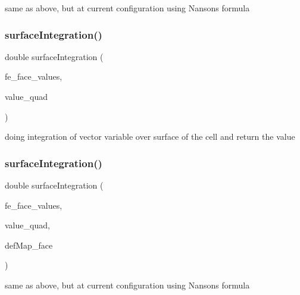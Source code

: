 same as above, but at current configuration using Nanson\textquotesingle{}s formula \mbox{\label{class_residual_a6753ecdc0e19b7bac24615d47889ae65}} 
\subsubsection{\texorpdfstring{surfaceIntegration()}{surfaceIntegration()}\hspace{0.1cm}{\footnotesize\ttfamily [3/6]}}
{\footnotesize\ttfamily double surface\+Integration (\begin{DoxyParamCaption}\item[{const F\+E\+Face\+Values$<$ dim $>$ \&}]{fe\+\_\+face\+\_\+values,  }\item[{dealii\+::\+Table$<$ 1, Sacado\+::\+Fad\+::\+D\+Fad$<$ double $>$ $>$ \&}]{value\+\_\+quad }\end{DoxyParamCaption})}

doing integration of vector variable over surface of the cell and return the value \mbox{\label{class_residual_a71923ccf434fa6503c37afd0ca7d0100}} 
\subsubsection{\texorpdfstring{surfaceIntegration()}{surfaceIntegration()}\hspace{0.1cm}{\footnotesize\ttfamily [4/6]}}
{\footnotesize\ttfamily double surface\+Integration (\begin{DoxyParamCaption}\item[{const F\+E\+Face\+Values$<$ dim $>$ \&}]{fe\+\_\+face\+\_\+values,  }\item[{dealii\+::\+Table$<$ 1, Sacado\+::\+Fad\+::\+D\+Fad$<$ double $>$ $>$ \&}]{value\+\_\+quad,  }\item[{\mbox{\hyperlink{structdeformation_map}{deformation\+Map}}$<$ T, dim $>$ \&}]{def\+Map\+\_\+face }\end{DoxyParamCaption})}

same as above, but at current configuration using Nanson\textquotesingle{}s formula \mbox{\label{class_residual_a454c4fd90cd46e3108e3d76eccbf2075}} 

